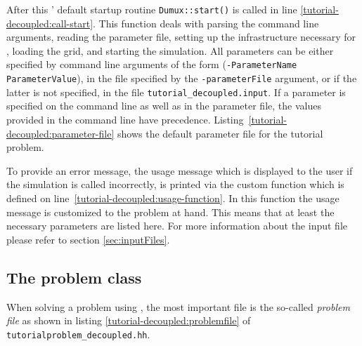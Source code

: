 After this \Dumux' default startup routine \texttt{Dumux::start()} is
called in line \ref{tutorial-decoupled:call-start}. This function deals
with parsing the command line arguments, reading the parameter file,
setting up the infrastructure necessary for \Dune, loading the grid, and
starting the simulation. All parameters can
be either specified by command line arguments of the form
(\texttt{-ParameterName ParameterValue}), in the file specified by the
\texttt{-parameterFile} argument, or if the latter is not specified,
in the file \texttt{tutorial\_decoupled.input}. If a parameter is
specified on the command line as well as in the parameter file, the
values provided in the command line have
precedence. Listing~\ref{tutorial-decoupled:parameter-file} shows the
default parameter file for the tutorial problem.

\begin{lst}\label{tutorial-decoupled:parameter-file} \mbox{}

\end{lst}

To provide an error message, the usage message which is displayed to
the user if the simulation is called incorrectly, is printed via the
custom function which is defined on
line~\ref{tutorial-decoupled:usage-function}. In this function the usage
message is customized to the problem at hand. This means that at least
the necessary parameters are listed here.  For more information about
the input file please refer to section \ref{sec:inputFiles}.

\subsection{The problem class} \label{decoupled_problem}

When solving a problem using \Dumux, the most important file is the
so-called \textit{problem file} as shown in listing
\ref{tutorial-decoupled:problemfile} of
\texttt{tutorialproblem\_decoupled.hh}.

\begin{lst}\label{tutorial-decoupled:problemfile} \mbox{}

\end{lst}

